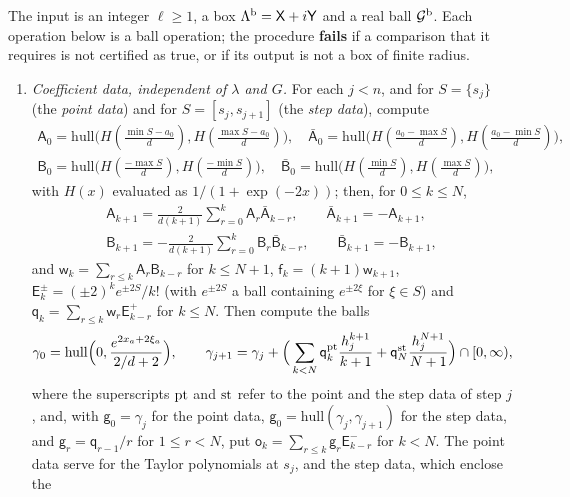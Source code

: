 The input is an integer $\ell\ge1$, a box $\Lambda^{\rm b}=\mathsf X+i\mathsf Y$ and a
real ball $\mathcal G^{\rm b}$. Each operation below is a ball operation; the
procedure \textbf{fails} if a comparison that it requires is not certified as
true, or if its output is not a box of finite radius.
\begin{enumerate}[label=\textup{(\roman*)}]
\item \emph{Coefficient data, independent of $\lambda$ and $G$.} For each $j<n$,
  and for $S=\{s_j\}$ (the \emph{point data}) and for $S=[s_j,s_{j+1}]$ (the
  \emph{step data}), compute
  \[
  \begin{gathered}
  \mathsf A_0=\mathrm{hull}\big(H(\tfrac{\min S-a_0}d),H(\tfrac{\max S-a_0}d)\big),\quad
  \bar{\mathsf A}_0=\mathrm{hull}\big(H(\tfrac{a_0-\max S}d),H(\tfrac{a_0-\min S}d)\big),\\
  \mathsf B_0=\mathrm{hull}\big(H(\tfrac{-\max S}d),H(\tfrac{-\min S}d)\big),\quad
  \bar{\mathsf B}_0=\mathrm{hull}\big(H(\tfrac{\min S}d),H(\tfrac{\max S}d)\big),
  \end{gathered}
  \]
  with $H(x)$ evaluated as $1/(1+\exp(-2x))$; then, for $0\le k\le N$,
  \[
  \begin{gathered}
  \mathsf A_{k+1}=\frac{2}{d(k+1)}\sum_{r=0}^k\mathsf A_r\bar{\mathsf A}_{k-r},\qquad
  \bar{\mathsf A}_{k+1}=-\mathsf A_{k+1},\\
  \mathsf B_{k+1}=-\frac{2}{d(k+1)}\sum_{r=0}^k\mathsf B_r\bar{\mathsf B}_{k-r},\qquad
  \bar{\mathsf B}_{k+1}=-\mathsf B_{k+1},
  \end{gathered}
  \]
  and $\mathsf w_k=\sum_{r\le k}\mathsf A_r\mathsf B_{k-r}$ for $k\le N+1$,
  $\mathsf f_k=(k+1)\mathsf w_{k+1}$, $\mathsf E^\pm_k=(\pm2)^ke^{\pm2S}/k!$ (with $e^{\pm2S}$ a
  ball containing $e^{\pm2\xi}$ for $\xi\in S$) and
  $\mathsf q_k=\sum_{r\le k}\mathsf w_r\mathsf E^+_{k-r}$ for $k\le N$. Then compute the
  balls
  \[
  \gamma_0=\mathrm{hull}\Big(0,\frac{e^{2x_a+2\xi_a}}{2/d+2}\Big),\qquad
  \gamma_{j+1}=\gamma_j+\Big(\sum_{k<N}\mathsf q_k^{\rm pt}\frac{h_j^{k+1}}{k+1}
  +\mathsf q_N^{\rm st}\frac{h_j^{N+1}}{N+1}\Big)\cap[0,\infty),
  \]
  where the superscripts ${\rm pt}$ and ${\rm st}$ refer to the point and the step
  data of step $j$, and, with $\mathsf g_0=\gamma_j$ for the point data,
  $\mathsf g_0=\mathrm{hull}(\gamma_j,\gamma_{j+1})$ for the step data, and
  $\mathsf g_r=\mathsf q_{r-1}/r$ for $1\le r<N$, put
  $\mathsf o_k=\sum_{r\le k}\mathsf g_r\mathsf E^-_{k-r}$ for $k<N$. The point data
  serve for the Taylor polynomials at $s_j$, and the step data, which enclose the

\end{enumerate}
